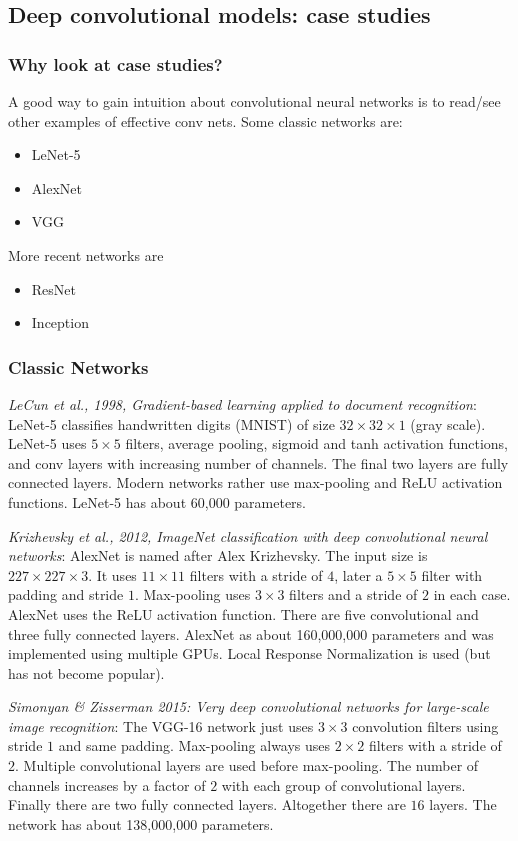 \documentclass{article}
\begin{document}
\subsection{Deep convolutional models: case studies}
\subsubsection{Why look at case studies?}
A good way to gain intuition about convolutional neural networks is to read/see other examples of effective conv nets.
Some classic networks are:
\begin{itemize}
  \item LeNet-5
  \item AlexNet
  \item VGG
\end{itemize}
More recent networks are
\begin{itemize}
  \item ResNet
  \item Inception
\end{itemize}

\subsubsection{Classic Networks}
\emph{LeCun et al., 1998, Gradient-based learning applied to document recognition}:
LeNet-5 classifies handwritten digits (MNIST) of size $32\times 32\times 1$ (gray scale).
LeNet-5 uses $5\times 5$ filters, average pooling, sigmoid and tanh activation functions,
and conv layers with increasing number of channels.
The final two layers are fully connected layers.
Modern networks rather use max-pooling and ReLU activation functions.
LeNet-5 has about 60,000 parameters.

\emph{Krizhevsky et al., 2012, ImageNet classification with deep convolutional neural networks}:
AlexNet is named after Alex Krizhevsky.
The input size is $227\times 227\times 3$.
It uses $11\times 11$ filters with a stride of $4$, later a $5\times 5$ filter with padding and stride $1$.
Max-pooling uses $3\times 3$ filters and a stride of $2$ in each case.
AlexNet uses the ReLU activation function.
There are five convolutional and three fully connected layers.
AlexNet as about 160,000,000 parameters and was implemented using multiple GPUs.
Local Response Normalization is used (but has not become popular).

\emph{Simonyan \& Zisserman 2015: Very deep convolutional networks for large-scale image recognition}:
The VGG-16 network just uses $3\times 3$ convolution filters using stride $1$ and same padding.
Max-pooling always uses $2\times 2$ filters with a stride of $2$.
Multiple convolutional layers are used before max-pooling.
The number of channels increases by a factor of $2$ with each group of convolutional layers.
Finally there are two fully connected layers.
Altogether there are $16$ layers.
The network has about 138,000,000 parameters.
\end{document}
